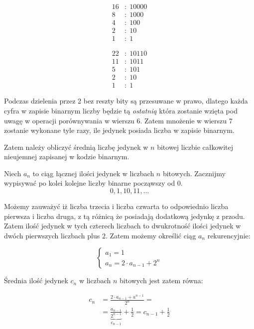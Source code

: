 \documentclass[a4paper,12pt]{article}
\begin{document}
\begin{minipage}[c]{0.5\textwidth}
		\begin{align*}
				16&: \; 10000 \\
				8&: \; 1000 \\
				4&:\; 100 \\
				2&:\; 10\\
				1&:\; 1
		\end{align*}
\end{minipage}
\begin{minipage}[c]{0.5\textwidth}
		\begin{align*}
				22&: \; 10110\\
				11&: \; 1011\\
				5&: \; 101\\
				2&: \; 10\\
				1&: \; 1
		\end{align*}
\end{minipage}

Podczas dzielenia przez 2 bez reszty bity są przesuwane w prawo, dlatego każda cyfra w zapisie binarnym liczby
będzie tą \emph{ostatnią} która zostanie wzięta pod uwagę w operacji porównywania w wierszu 6. Zatem mnożenie w 
wierszu 7 zostanie wykonane tyle razy, ile jedynek posiada liczba w zapisie binarnym.

Zatem należy obliczyć średnią liczbę jedynek w $n$ bitowej liczbie całkowitej nieujemnej zapisanej w kodzie binarnym.
\medskip

Niech $a_n$ to ciąg łącznej ilości jedynek w liczbach $n$ bitowych. Zacznijmy wypisywać po kolei kolejne liczby binarne
począwszy od 0.
\[0,  1, 10, 11, \dots\]

Możemy zauważyć iż liczba trzecia i liczba czwarta to odpowiednio liczba pierwsza i liczba druga, z tą różnicą
że posiadają dodatkową jedynkę z przodu. Zatem ilość jedynek w tych czterech liczbach to dwukrotność ilości jedynek
w dwóch pierwszych liczbach plus 2. Zatem możemy określić ciąg $a_n$ rekurencyjnie:

\[
		\left\{
				\begin{array}{l}
						a_1 = 1 \\
						a_n = 2\cdot a_{n-1} + 2^n
				\end{array}
		\right.
\]

Średnia ilość jedynek $c_n$ w liczbach $n$ bitowych jest zatem równa:

\begin{align*}
		c_n &= \frac{ 2 \cdot a_{n-1} + a^{n-1}}{2^n} = \\
		&= \underbrace{\frac{a_{n-1}}{2^{n-1}}}_{c_{n-1}} + \frac{1}{2} = c_{n-1} + \frac{1}{2}
\end{align*}
\end{document}
